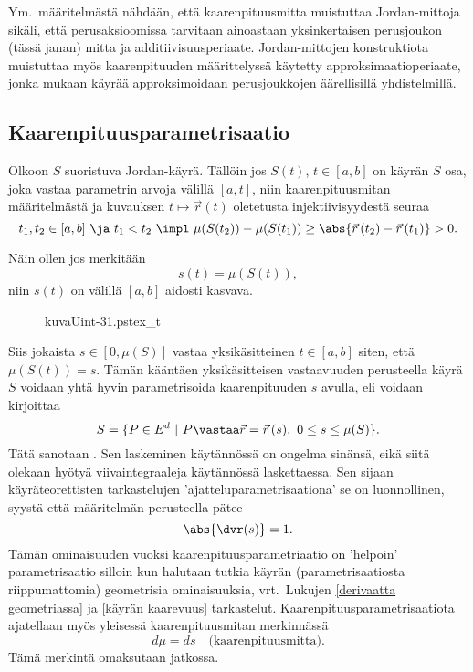 Ym.\ määritelmästä nähdään, että kaarenpituusmitta muistuttaa Jordan-mittoja sikäli, että 
perusaksioomissa tarvitaan ainoastaan yksinkertaisen perusjoukon (tässä janan) mitta ja 
additiivisuusperiaate. Jordan-mittojen konstruktiota muistuttaa myös kaarenpituuden 
määrittelyssä käytetty approksimaatioperiaate, jonka mukaan käyrää approksimoidaan 
perusjoukkojen äärellisillä yhdistelmillä. 

\subsection{Kaarenpituusparametrisaatio}

Olkoon $S$ suoristuva Jordan-käyrä. Tällöin jos $S(t)$, $t\in [a,b]$ on käyrän $S$ osa, joka
vastaa parametrin arvoja välillä $[a,t]$, niin kaarenpituusmitan määritelmästä ja kuvauksen
$t\mapsto\vec r(t)$ oletetusta injektiivisyydestä seuraa
\[
t_1,t_2\in [a,b] \ \ja \ t_1<t_2 \ 
               \impl \ \mu(S(t_2))-\mu(S(t_1)) \ge \abs{\vec r\,(t_2)-\vec r\,(t_1)} > 0.
\]
\begin{multicols}{2} \raggedcolumns
Näin ollen jos merkitään
\[
s(t)=\mu(S(t)),
\]
niin $s(t)$ on välillä $[a,b]$ aidosti kasvava. 
\begin{figure}[H]
\begin{center}
{kuvaUint-31.pstex_t}
\end{center}
\end{figure}
\end{multicols}
Siis jokaista $s\in [0,\mu(S)]$ vastaa yksikäsitteinen $t\in [a,b]$ siten, että
$\mu(S(t))=s$. Tämän kääntäen yksikäsitteisen vastaavuuden perusteella käyrä $S$ voidaan yhtä
hyvin parametrisoida kaarenpituuden $s$ avulla, eli voidaan kirjoittaa
\[
S=\{P\in E^d \ | \ P\vastaa \vec r=\vec r\,(s), \ 0\leq s\leq\mu(S)\}.
\]
Tätä sanotaan . Sen laskeminen käytännössä on ongelma
sinänsä, eikä siitä olekaan hyötyä viivaintegraaleja käytännössä laskettaessa. Sen sijaan
käyräteorettisten tarkastelujen 'ajatteluparametrisaationa' se on luonnollinen, syystä että
määritelmän perusteella pätee
\[
\abs{\dvr(s)}=1.
\]
Tämän ominaisuuden vuoksi kaarenpituusparametriaatio on 'helpoin' parametrisaatio silloin kun
halutaan tutkia käyrän (parametrisaatiosta riippumattomia) geometrisia ominaisuuksia, vrt.\
Lukujen \ref{derivaatta geometriassa} ja \ref{käyrän kaarevuus} tarkastelut.
Kaarenpituusparametrisaatiota ajatellaan myös yleisessä kaarenpituusmitan merkinnässä
\[
d\mu=ds \quad \text{(kaarenpituusmitta)}.
\]
Tämä merkintä omaksutaan jatkossa.

